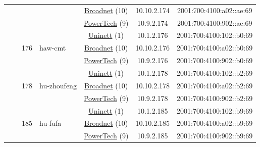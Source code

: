 \begin{small}
\begin{center}
\begin{longtable}{|c|c|c|c|c|c|c|c|}
  &  &  &  & \multicolumn{2}{|c|}{\tiny{\href{https://www.broadnet.no}{Broadnet} (10)}} & \tiny{10.10.2.174} & \tiny{2001:700:4100:a02::ae:69} \\* \cline{5-5}\cline{6-6}\cline{7-7}\cline{8-8}
  &  &  &  & \multicolumn{2}{|c|}{\tiny{\href{http://www.powertech.no}{PowerTech} (9)}} & \tiny{10.9.2.174} & \tiny{2001:700:4100:902::ae:69} \\* \cline{3-3}\cline{4-4}\cline{5-5}\cline{6-6}\cline{7-7}\cline{8-8}
  &  & \multirow{3}{*}{\tiny{176}} & \multicolumn{1}{|l|}{\multirow{3}{*}{\tiny{haw-cmt}}} & \multicolumn{2}{|c|}{\tiny{\href{https://www.uninett.no}{Uninett} (1)}} & \tiny{10.1.2.176} & \tiny{2001:700:4100:102::b0:69} \\* \cline{5-5}\cline{6-6}\cline{7-7}\cline{8-8}
  &  &  &  & \multicolumn{2}{|c|}{\tiny{\href{https://www.broadnet.no}{Broadnet} (10)}} & \tiny{10.10.2.176} & \tiny{2001:700:4100:a02::b0:69} \\* \cline{5-5}\cline{6-6}\cline{7-7}\cline{8-8}
  &  &  &  & \multicolumn{2}{|c|}{\tiny{\href{http://www.powertech.no}{PowerTech} (9)}} & \tiny{10.9.2.176} & \tiny{2001:700:4100:902::b0:69} \\* \cline{3-3}\cline{4-4}\cline{5-5}\cline{6-6}\cline{7-7}\cline{8-8}
  &  & \multirow{3}{*}{\tiny{178}} & \multicolumn{1}{|l|}{\multirow{3}{*}{\tiny{hu-zhoufeng}}} & \multicolumn{2}{|c|}{\tiny{\href{https://www.uninett.no}{Uninett} (1)}} & \tiny{10.1.2.178} & \tiny{2001:700:4100:102::b2:69} \\* \cline{5-5}\cline{6-6}\cline{7-7}\cline{8-8}
  &  &  &  & \multicolumn{2}{|c|}{\tiny{\href{https://www.broadnet.no}{Broadnet} (10)}} & \tiny{10.10.2.178} & \tiny{2001:700:4100:a02::b2:69} \\* \cline{5-5}\cline{6-6}\cline{7-7}\cline{8-8}
  &  &  &  & \multicolumn{2}{|c|}{\tiny{\href{http://www.powertech.no}{PowerTech} (9)}} & \tiny{10.9.2.178} & \tiny{2001:700:4100:902::b2:69} \\* \cline{3-3}\cline{4-4}\cline{5-5}\cline{6-6}\cline{7-7}\cline{8-8}
  &  & \multirow{3}{*}{\tiny{185}} & \multicolumn{1}{|l|}{\multirow{3}{*}{\tiny{hu-fufa}}} & \multicolumn{2}{|c|}{\tiny{\href{https://www.uninett.no}{Uninett} (1)}} & \tiny{10.1.2.185} & \tiny{2001:700:4100:102::b9:69} \\* \cline{5-5}\cline{6-6}\cline{7-7}\cline{8-8}
  &  &  &  & \multicolumn{2}{|c|}{\tiny{\href{https://www.broadnet.no}{Broadnet} (10)}} & \tiny{10.10.2.185} & \tiny{2001:700:4100:a02::b9:69} \\* \cline{5-5}\cline{6-6}\cline{7-7}\cline{8-8}
  &  &  &  & \multicolumn{2}{|c|}{\tiny{\href{http://www.powertech.no}{PowerTech} (9)}} & \tiny{10.9.2.185} & \tiny{2001:700:4100:902::b9:69} \\ \hline
\end{longtable}
\end{center}
\end{small}



